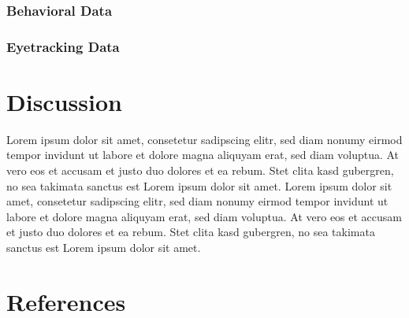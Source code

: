 \documentclass[
  english,
  man,floatsintext]{apa6}
\begin{document}
\hypertarget{behavioral-data-3}{%
\subsubsection{Behavioral Data}\label{behavioral-data-3}}

\hypertarget{eyetracking-data-3}{%
\subsubsection{Eyetracking Data}\label{eyetracking-data-3}}

\hypertarget{discussion}{%
\section{Discussion}\label{discussion}}

Lorem ipsum dolor sit amet, consetetur sadipscing elitr, sed diam nonumy eirmod tempor invidunt ut labore et dolore magna aliquyam erat, sed diam voluptua. At vero eos et accusam et justo duo dolores et ea rebum. Stet clita kasd gubergren, no sea takimata sanctus est Lorem ipsum dolor sit amet. Lorem ipsum dolor sit amet, consetetur sadipscing elitr, sed diam nonumy eirmod tempor invidunt ut labore et dolore magna aliquyam erat, sed diam voluptua. At vero eos et accusam et justo duo dolores et ea rebum. Stet clita kasd gubergren, no sea takimata sanctus est Lorem ipsum dolor sit amet.

\newpage

\hypertarget{references}{%
\section{References}\label{references}}

\begingroup
\setlength{\parindent}{-0.5in}
\setlength{\leftskip}{0.5in}
\end{document}
